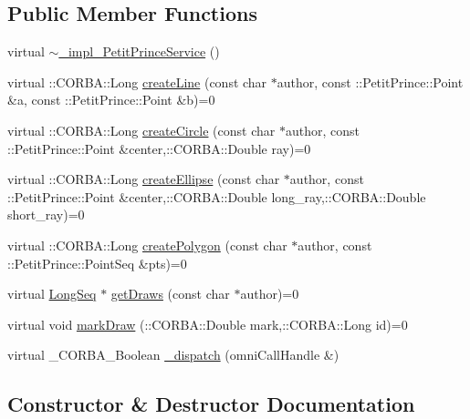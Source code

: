\subsection*{Public Member Functions}
\begin{DoxyCompactItemize}
\item 
virtual \hyperlink{class__impl___petit_prince_service_a477c2f68aac99912c47455657764b266}{$\sim$\+\_\+impl\+\_\+\+Petit\+Prince\+Service} ()
\item 
virtual \+::C\+O\+R\+B\+A\+::\+Long \hyperlink{class__impl___petit_prince_service_a7d0f1d9c237b859cba5e5d98ef248069}{create\+Line} (const char $\ast$author, const \+::Petit\+Prince\+::\+Point \&a, const \+::Petit\+Prince\+::\+Point \&b)=0
\item 
virtual \+::C\+O\+R\+B\+A\+::\+Long \hyperlink{class__impl___petit_prince_service_a8b07dfb70c61bb9d6367bacf1a0230d3}{create\+Circle} (const char $\ast$author, const \+::Petit\+Prince\+::\+Point \&center,\+::C\+O\+R\+B\+A\+::\+Double ray)=0
\item 
virtual \+::C\+O\+R\+B\+A\+::\+Long \hyperlink{class__impl___petit_prince_service_ad8fb48af108a078b4ee0a3679a72499f}{create\+Ellipse} (const char $\ast$author, const \+::Petit\+Prince\+::\+Point \&center,\+::C\+O\+R\+B\+A\+::\+Double long\+\_\+ray,\+::C\+O\+R\+B\+A\+::\+Double short\+\_\+ray)=0
\item 
virtual \+::C\+O\+R\+B\+A\+::\+Long \hyperlink{class__impl___petit_prince_service_a89b8c0ca5d95f6712916a5e781f1f9ed}{create\+Polygon} (const char $\ast$author, const \+::Petit\+Prince\+::\+Point\+Seq \&pts)=0
\item 
virtual \hyperlink{class_long_seq}{Long\+Seq} $\ast$ \hyperlink{class__impl___petit_prince_service_af45641fd3b57ebe1debe37abf0550bba}{get\+Draws} (const char $\ast$author)=0
\item 
virtual void \hyperlink{class__impl___petit_prince_service_aa89e2ba56851bcc143f01f8d96fd1e42}{mark\+Draw} (\+::C\+O\+R\+B\+A\+::\+Double mark,\+::C\+O\+R\+B\+A\+::\+Long id)=0
\item 
virtual \+\_\+\+C\+O\+R\+B\+A\+\_\+\+Boolean \hyperlink{class__impl___petit_prince_service_ac4dc7df1a3329636533b195a84932940}{\+\_\+dispatch} (omni\+Call\+Handle \&)
\end{DoxyCompactItemize}


\subsection{Constructor \& Destructor Documentation}
